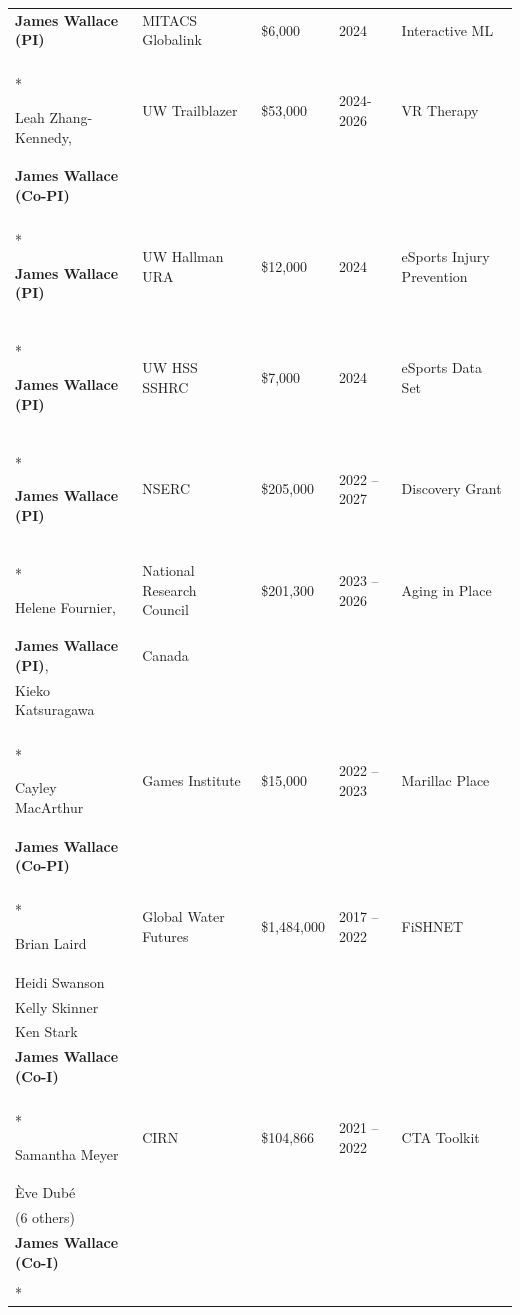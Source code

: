 \documentclass[12pt]{article}
\begin{document}
\begin{longtable}[c]{p{4.5cm} l l l p{4.5cm}}
\textbf{James Wallace (PI)}      & MITACS Globalink & \$6,000   & 2024 & Interactive ML \\
\\*

Leah Zhang-Kennedy, & UW Trailblazer & \$53,000 & 2024-2026 & VR Therapy \\
\textbf{James Wallace (Co-PI)} \\
\\*

\textbf{James Wallace (PI)}       &   UW Hallman URA    & \$12,000   & 2024 & eSports Injury Prevention \\
\\*

\textbf{James Wallace (PI)}       &   UW HSS SSHRC    & \$7,000   & 2024 & eSports Data Set \\
\\*

\textbf{James Wallace (PI)}      &   NSERC   & \$205,000 &   2022 -- 2027 &   Discovery Grant \\
\\*

Helene Fournier,   &   National Research Council & \$201,300 & 2023 -- 2026 & Aging in Place \\
\textbf{James Wallace (PI)}, & Canada \\ 
Kieko Katsuragawa \\
\\*


Cayley MacArthur & Games Institute & \$15,000 & 2022 -- 2023 & Marillac Place \\
\textbf{James Wallace (Co-PI)}  \\
\\*

Brian Laird & Global Water Futures & \$1,484,000 & 2017 -- 2022 & FiSHNET \\
Heidi Swanson \\
Kelly Skinner \\
Ken Stark \\
\textbf{James Wallace (Co-I)} \\
\\*

Samantha Meyer  & CIRN  &   \$104,866   & 2021 -- 2022   &   CTA Toolkit \\
Ève Dubé \\ (6 others) \\
\textbf{James Wallace (Co-I)} \\
\\*


\end{longtable}
\end{document}
